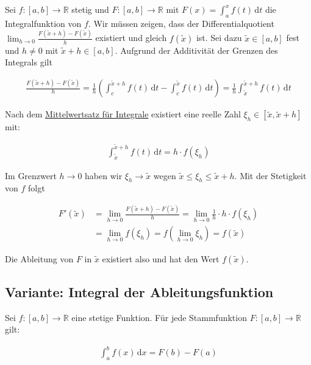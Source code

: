 \documentclass[fontsize=9pt,
               parskip=half-,
               DIV=14,
               listof=chapterentry,
               tocflat]{scrbook}
\renewcommand*{\rm}[1]{\mathrm{#1}}
\begin{document}
\begin{proof*}
Sei $f:[a,b]\to \mathbb {R} $ stetig und $F:[a,b]\to \mathbb {R} $ mit $F(x)=\int _{a}^{x}f(t)\,\mathrm {d} t$ die Integralfunktion von $f$. Wir müssen zeigen, dass der Differentialquotient $\lim _{h\to 0}{\frac {F({\tilde {x}}+h)-F({\tilde {x}})}{h}}$ existiert und gleich $f({\tilde {x}})$ ist. Sei dazu ${\tilde {x}}\in [a,b]$ fest und $h\neq 0$ mit ${\tilde {x}}+h\in [a,b]$. Aufgrund der Additivität der Grenzen des Integrals gilt

\begin{align*}
{\frac {F({\tilde {x}}+h)-F({\tilde {x}})}{h}}={\frac {1}{h}}\left(\int _{c}^{{\tilde {x}}+h}f(t)\,{\rm {d}}t-\int _{c}^{\tilde {x}}f(t)\,{\rm {d}}t\right)={\frac {1}{h}}\int _{\tilde {x}}^{{\tilde {x}}+h}f(t)\,{\rm {d}}t
\end{align*}

Nach dem \href{https://de.wikibooks.org/wiki/Mathe\_für\_Nicht-Freaks:\_Mittelwertsatz\_für\_Integrale}
{Mittelwertsatz für Integrale} existiert eine reelle Zahl $\xi _{h}\in [{\tilde {x}},{\tilde {x}}+h]$ mit:

\begin{align*}
\int _{\tilde {x}}^{{\tilde {x}}+h}f(t)\,{\rm {d}}t=h\cdot f(\xi _{h})
\end{align*}

Im Grenzwert $h\to 0$ haben wir $\xi _{h}\to {\tilde {x}}$ wegen ${\tilde {x}}\leq \xi _{h}\leq {\tilde {x}}+h$. Mit der Stetigkeit von $f$ folgt

\begin{align*}
F'({\tilde {x}})&=\lim _{h\to 0}{\frac {F({\tilde {x}}+h)-F({\tilde {x}})}{h}}=\lim _{h\to 0}{\frac {1}{h}}\cdot h\cdot f(\xi _{h})\\[0.5em]&=\lim _{h\to 0}f(\xi _{h})=f\left(\lim _{h\to 0}\xi _{h}\right)=f({\tilde {x}})
\end{align*}

Die Ableitung von $F$ in ${\tilde {x}}$ existiert also und hat den Wert $f({\tilde {x}})$.

\end{proof*}

\subsection{Variante: Integral der Ableitungsfunktion}

\begin{theorem*}
Sei $f\colon [a,b]\to \mathbb {R} $ eine stetige Funktion. Für jede Stammfunktion $F\colon [a,b]\to \mathbb {R} $ gilt:

\begin{align*}
\int _{a}^{b}f(x)\,\mathrm {d} x=F(b)-F(a)
\end{align*}

\end{theorem*}
\end{document}
